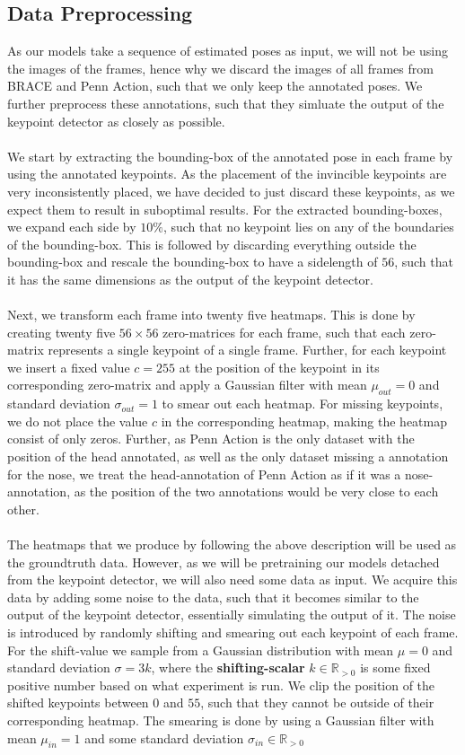 \documentclass[./main.tex]{subfiles}
\begin{document}
\subsection{Data Preprocessing}
\label{sec:pretrain_data_preprocessing}
As our models take a sequence of estimated poses as input, we will not be using the images of the frames, hence why we discard the images of all frames from BRACE and Penn Action, such that we only keep the annotated poses. We further preprocess these annotations, such that they simluate the output of the keypoint detector as closely as possible.
\\
\\
We start by extracting the bounding-box of the annotated pose in each frame by using the annotated keypoints. As the placement of the invincible keypoints are very inconsistently placed, we have decided to just discard these keypoints, as we expect them to result in suboptimal results. For the extracted bounding-boxes, we expand each side by $10\%$, such that no keypoint lies on any of the boundaries of the bounding-box. This is followed by discarding everything outside the bounding-box and rescale the bounding-box to have a sidelength of $56$, such that it has the same dimensions as the output of the keypoint detector.
\\
\\
Next, we transform each frame into twenty five heatmaps. This is done by creating twenty five $56 \times 56$ zero-matrices for each frame, such that each zero-matrix represents a single keypoint of a single frame. Further, for each keypoint we insert a fixed value $c = 255$ at the position of the keypoint in its corresponding zero-matrix and apply a Gaussian filter with mean $\mu_{out} = 0$ and standard deviation $\sigma_{out} = 1$ to smear out each heatmap. For missing keypoints, we do not place the value $c$ in the corresponding heatmap, making the heatmap consist of only zeros. Further, as Penn Action is the only dataset with the position of the head annotated, as well as the only dataset missing a annotation for the nose, we treat the head-annotation of Penn Action as if it was a nose-annotation, as the position of the two annotations would be very close to each other.
\\
\\
The heatmaps that we produce by following the above description will be used as the groundtruth data. However, as we will be pretraining our models detached from the keypoint detector, we will also need some data as input. We acquire this data by adding some noise to the data, such that it becomes similar to the output of the keypoint detector, essentially simulating the output of it. The noise is introduced by randomly shifting and smearing out each keypoint of each frame. For the shift-value we sample from a Gaussian distribution with mean $\mu = 0$ and standard deviation $\sigma = 3k$, where the \textbf{shifting-scalar} $k \in \mathbb{R}_{>0}$ is some fixed positive number based on what experiment is run. We clip the position of the shifted keypoints between $0$ and $55$, such that they cannot be outside of their corresponding heatmap. The smearing is done by using a Gaussian filter with mean $\mu_{in} = 1$ and some standard deviation $\sigma_{in} \in \mathbb{R}_{>0}$
\end{document}
